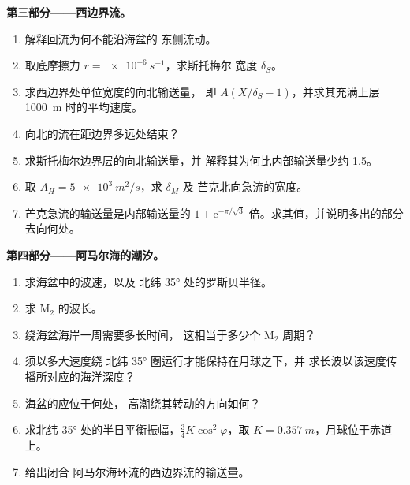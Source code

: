 \begin{problem}
\medskip\noindent\textbf{第三部分——西边界流。}
\begin{enumerate}[resume]
\item 解释回流为何不能沿海盆的
  东侧流动。
\item 取底摩擦力 $r = \qty{e-6}{s^{-1}}$，求斯托梅尔
  宽度 $\delta_S$。
\item 求西边界处单位宽度的向北输送量，
  即 $A(X/\delta_S - 1)$，并求其充满上层
  \qty{1000}{m} 时的平均速度。
\item 向北的流在距边界多远处结束？
\item 求斯托梅尔边界层的向北输送量，并
  解释其为何比内部输送量少约
  \qty{1.5}{\sverdrup}。
\item 取 $A_H = \qty{5e3}{m^2/s}$，求 $\delta_M$ 及
  芒克北向急流的宽度。
\item 芒克急流的输送量是内部输送量的 $1 + \mathrm e^{-\pi/\sqrt3}$
  倍。求其值，并说明多出的部分去向何处。
\end{enumerate}

\medskip\noindent\textbf{第四部分——阿马尔海的潮汐。}
\begin{enumerate}[resume]
\item 求海盆中的波速，以及
  北纬 \ang{35} 处的罗斯贝半径。
\item 求 M$_2$ 的波长。
\item {}绕海盆海岸一周需要多长时间，
  这相当于多少个 M$_2$ 周期？
\item {}须以多大速度绕
  北纬 \ang{35} 圈运行才能保持在月球之下，并
  求长波以该速度传播所对应的海洋深度？
\item 海盆的应位于何处，
  高潮绕其转动的方向如何？
\item 求北纬 \ang{35} 处的半日平衡振幅，$\tfrac34
  K\cos^2\varphi$，取 $K = \qty{0.357}{m}$，月球位于赤道上。
\item 给出闭合
  阿马尔海环流的西边界流的输送量。
\end{enumerate}
\end{problem}
